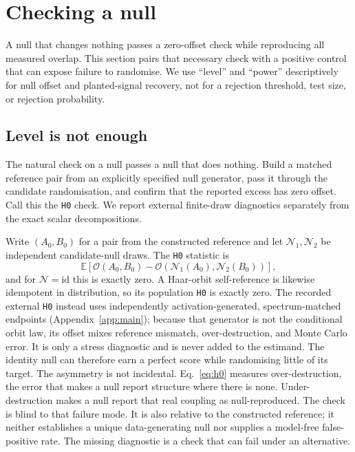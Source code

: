 \section{Checking a null}
\label{sec:validate}

A null that changes nothing passes a zero-offset check while reproducing all measured overlap.
This section pairs that necessary check with a positive control that can expose failure to
randomise. We use ``level'' and ``power'' descriptively for null offset and planted-signal
recovery, not for a rejection threshold, test size, or rejection probability.

\subsection{Level is not enough}
\label{sec:level}

The natural check on a null passes a null that does nothing. Build a matched reference pair from
an explicitly specified null generator, pass it through the candidate randomisation, and confirm
that the reported excess has zero offset. Call this the \texttt{H0} check. We report external
finite-draw diagnostics separately from the exact scalar decompositions.

Write $(A_0,B_0)$ for a pair from the constructed reference and let
$\mathcal N_1,\mathcal N_2$ be independent candidate-null draws. The \texttt{H0} statistic is
\begin{equation}
  \mathbb{E}\left[\mathcal{O}(A_0,B_0)-
  \mathcal{O}(\mathcal N_1(A_0),\mathcal N_2(B_0))\right],
  \label{eq:h0}
\end{equation}
and for $\mathcal N=\mathrm{id}$ this is exactly zero. A Haar-orbit self-reference is likewise
idempotent in distribution, so its population \texttt{H0} is exactly zero. The recorded external
\texttt{H0} instead uses independently activation-generated, spectrum-matched endpoints
(Appendix~\ref{app:main}); because that generator is not the conditional orbit law, its offset
mixes reference mismatch, over-destruction, and Monte Carlo error. It is only a stress diagnostic
and is never added to the estimand.
The identity null can therefore earn a perfect score while randomising little of its target.
The asymmetry is not incidental. Eq.~\ref{eq:h0} measures over-destruction, the error that makes
a null report structure where there is none. Under-destruction makes a null report that real
coupling as null-reproduced. The check is blind to that failure mode. It is also relative to the
constructed reference; it neither establishes a unique data-generating null nor supplies a
model-free false-positive rate. The missing diagnostic is a check that can fail under an
alternative.


